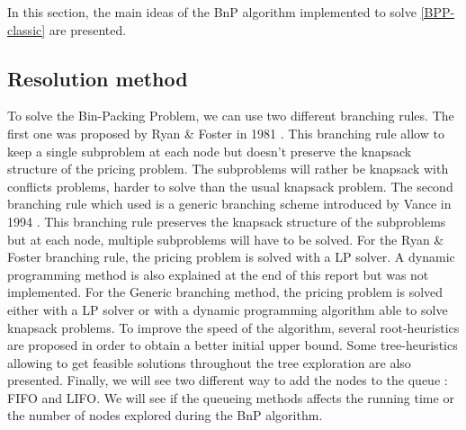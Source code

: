 In this section, the main ideas of the BnP algorithm implemented to solve \eqref{BPP-classic} are presented.

\subsection{Resolution method}

To solve the Bin-Packing Problem, we can use two different branching rules. The first one was proposed by Ryan \& Foster in 1981 \cite{ryan1981rn}. This branching rule allow to keep a single subproblem at each node but doesn't preserve the knapsack structure of the pricing problem. The subproblems will rather be knapsack with conflicts problems, harder to solve than the usual knapsack problem. The second branching rule which  used is a generic branching scheme introduced by Vance in 1994 \cite{vance1994solving}. This branching rule preserves the knapsack structure of the subproblems but at each node, multiple subproblems will have to be solved. For the Ryan \& Foster branching rule, the pricing problem is solved with a LP solver. A dynamic programming method is also explained at the end of this report but was not implemented. For the Generic branching method, the pricing problem is solved either with a LP solver or with a dynamic programming algorithm able to solve knapsack problems. To improve the speed of the algorithm, several root-heuristics are proposed in order to obtain a better initial upper bound. Some tree-heuristics allowing to get feasible solutions throughout the tree exploration are also presented. Finally, we will see two different way to add the nodes to the queue : FIFO and LIFO. We will see if the queueing methods affects the running time or the number of nodes explored during the BnP algorithm.